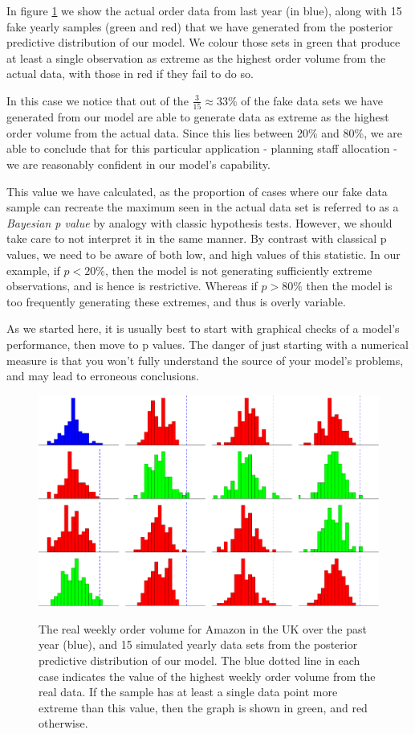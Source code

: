 \documentclass[11pt,fullpage]{book}
\begin{document}
In figure \ref{fig:Evaluation_amazonExample} we show the actual order data from last year (in blue), along with 15 fake yearly samples (green and red) that we have generated from the posterior predictive distribution of our model. We colour those sets in green that produce at least a single observation as extreme as the highest order volume from the actual data, with those in red if they fail to do so. 

In this case we notice that out of the $\frac{3}{15}\approx 33\%$ of the fake data sets we have generated from our model are able to generate data as extreme as the highest order volume from the actual data. Since this lies between 20\% and 80\%, we are able to conclude that for this particular application - planning staff allocation - we are reasonably confident in our model's capability.

This value we have calculated, as the proportion of cases where our fake data sample can recreate the maximum seen in the actual data set is referred to as a \textit{Bayesian p value} by analogy with classic hypothesis tests. However, we should take care to not interpret it in the same manner. By contrast with classical p values, we need to be aware of both low, and high values of this statistic. In our example, if $p<20\%$, then the model is not generating sufficiently extreme observations, and is hence is restrictive. Whereas if $p>80\%$ then the model is too frequently generating these extremes, and thus is overly variable.

As we started here, it is usually best to start with graphical checks of a model's performance, then move to p values. The danger of just starting with a numerical measure is that you won't fully understand the source of your model's problems, and may lead to erroneous conclusions.

\begin{figure}
\centering
\scalebox{0.5} 
{\includegraphics{Evaluation_amazonExample.pdf}}
\caption{The real weekly order volume for Amazon in the UK over the past year (blue), and 15 simulated yearly data sets from the posterior predictive distribution of our model. The blue dotted line in each case indicates the value of the highest weekly order volume from the real data. If the sample has at least a single data point more extreme than this value, then the graph is shown in green, and red otherwise.}\label{fig:Evaluation_amazonExample}
\end{figure}
\end{document}
